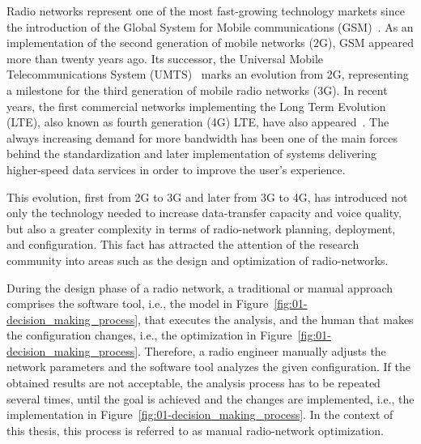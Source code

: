 Radio networks represent one of the most fast-growing technology markets
since the introduction of the Global System for Mobile communications
(GSM)~\cite{3GPP_TR_50.099}.
As an implementation of the second generation of mobile networks (2G),
GSM appeared more than twenty years ago. Its successor, the Universal
Mobile Telecommunications System (UMTS)~\cite{3GPP_TR_23.101}
marks an evolution from 2G, representing a milestone for the third
generation of mobile radio networks (3G).
In recent years, the first commercial networks implementing the Long
Term Evolution (LTE), also
known as fourth generation (4G)
LTE, have also appeared~\cite{Gerstenberger-Introduction_to_LTE:2011}.
The always increasing demand for more bandwidth has been one of the
main forces behind the standardization and later implementation of
systems delivering higher-speed data services in order to improve
the user's experience.

This evolution, first from 2G to 3G and later from 3G to 4G, has introduced
not only the technology needed to increase data-transfer capacity
and voice quality, but also a greater complexity in terms of radio-network
planning, deployment, and configuration. This fact has attracted the
attention of the research community into areas such as the design
and optimization of radio-networks.

During the design phase of a radio network, a traditional or manual
approach comprises the software tool, i.e., the model in Figure~\ref{fig:01-decision_making_process},
that executes the analysis, and the human that makes the configuration
changes, i.e., the optimization in Figure~\ref{fig:01-decision_making_process}.
Therefore, a radio engineer manually adjusts the network parameters
and the software tool analyzes the given configuration. If the obtained
results are not acceptable, the analysis process has to be repeated
several times, until the goal is achieved and the changes are implemented,
i.e., the implementation in Figure~\ref{fig:01-decision_making_process}.
In the context of this thesis, this process is referred to as manual
radio-network optimization. 

